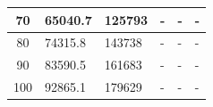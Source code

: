 \begin{table}[htp]
\begin{tabular}{|c|l|l|l|l|l|}
70                                                                         & 65040.7                              & 125793                                & -                                     & -                                     & -                                     \\ \hline
80                                                                         & 74315.8                              & 143738                                & -                                     & -                                     & -                                     \\ \hline
90                                                                         & 83590.5                              & 161683                                & -                                     & -                                     & -                                     \\ \hline
100                                                                        & 92865.1                              & 179629                                & -                                     & -                                     & -                                     \\ \hline
\end{tabular}
\end{table}


